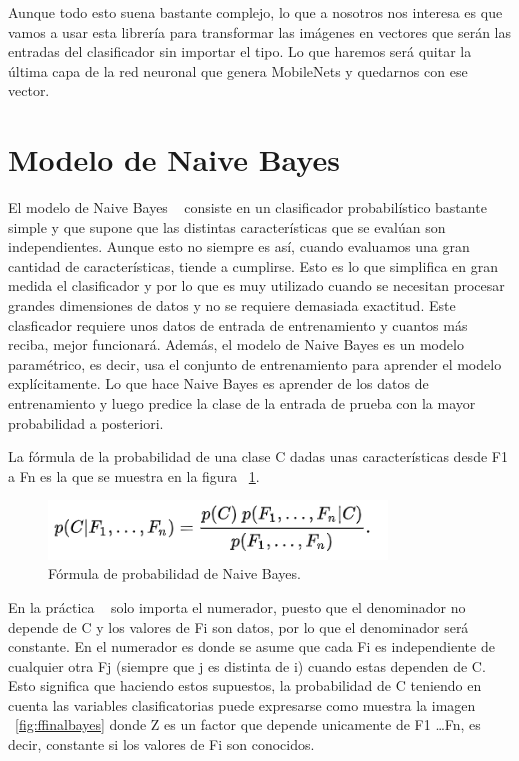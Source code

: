 \documentclass[a4paper, 12pt]{book}
\begin{document}
Aunque todo esto suena bastante complejo, lo que a nosotros nos interesa es que vamos a usar esta librería para transformar las imágenes en vectores que serán las entradas del clasificador sin importar el tipo. Lo que haremos será quitar la última capa de la red neuronal que genera MobileNets y quedarnos con ese vector.

\section{Modelo de Naive Bayes} 
\label{sec:modelobayes}

El modelo de Naive Bayes ~\cite{articulobayes} consiste en un clasificador probabilístico bastante simple y que supone que las distintas características que se evalúan son independientes. Aunque esto no siempre es así, cuando evaluamos una gran cantidad de características, tiende a cumplirse. Esto es lo que simplifica en gran medida el clasificador y por lo que es muy utilizado cuando se necesitan procesar grandes dimensiones de datos y no se requiere demasiada exactitud. Este clasficador requiere unos datos de entrada de entrenamiento y cuantos más reciba, mejor funcionará. Además, el modelo de Naive Bayes es un modelo paramétrico, es decir, usa el conjunto de entrenamiento para aprender el modelo explícitamente. Lo que hace Naive Bayes es aprender de los datos de entrenamiento y luego predice la clase de la entrada de prueba con la mayor probabilidad a posteriori.

La fórmula de la probabilidad de una clase C dadas unas características desde F1 a Fn es la que se muestra en la figura ~\ref{fig:formulabayes}.

\begin{figure}
	\centering
	\includegraphics[width=9cm, keepaspectratio]{img/formulabayes}
	\caption{Fórmula de probabilidad de Naive Bayes.}
	\label{fig:formulabayes}
\end{figure}

En la práctica ~\cite{machinelearning} solo importa el numerador, puesto que el denominador no depende de C y los valores de Fi son datos, por lo que el denominador será constante. En el numerador es donde se asume que cada Fi es independiente de cualquier otra Fj (siempre que j es distinta de i) cuando estas dependen de C. Esto significa que haciendo estos supuestos, la probabilidad de C teniendo en cuenta las variables clasificatorias puede expresarse como muestra la imagen ~\ref{fig:ffinalbayes} donde Z es un factor que depende unicamente de F1 \dots Fn, es decir, constante si los valores de Fi son conocidos.
\end{document}
